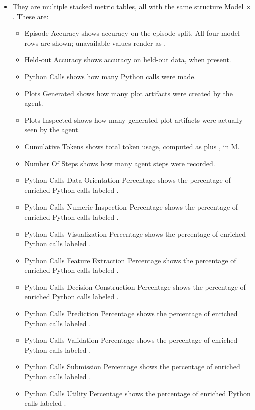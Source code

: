 \documentclass[11pt]{article}
\begin{document}
\begin{itemize}
  \item They are multiple stacked metric tables, all with the same structure Model × \termSimulator.
  These are: 
  \begin{itemize}
  \item Episode Accuracy shows accuracy on the episode split. All four model rows are shown; unavailable values render as \code{-}.
  \item Held-out Accuracy shows accuracy on held-out data, when present.
  \item Python Calls shows how many Python calls were made.
  \item Plots Generated shows how many plot artifacts were created by the agent.
  \item Plots Inspected shows how many generated plot artifacts were actually seen by the agent.
  \item Cumulative Tokens shows total token usage, computed as  plus , in M.
  \item Number Of Steps shows how many agent steps were recorded.
  \item Python Calls Data Orientation Percentage shows the percentage of enriched Python calls labeled .
  \item Python Calls Numeric Inspection Percentage shows the percentage of enriched Python calls labeled .
  \item Python Calls Visualization Percentage shows the percentage of enriched Python calls labeled .
  \item Python Calls Feature Extraction Percentage shows the percentage of enriched Python calls labeled .
  \item Python Calls Decision Construction Percentage shows the percentage of enriched Python calls labeled .
  \item Python Calls Prediction Percentage shows the percentage of enriched Python calls labeled .
  \item Python Calls Validation Percentage shows the percentage of enriched Python calls labeled .
  \item Python Calls Submission Percentage shows the percentage of enriched Python calls labeled .
  \item Python Calls Utility Percentage shows the percentage of enriched Python calls labeled .

\end{itemize}
\end{itemize}
\end{document}
